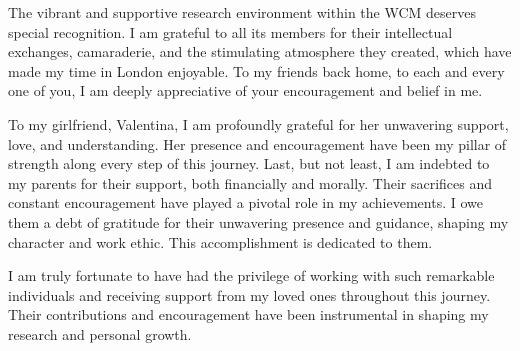 The vibrant and supportive research environment within the WCM deserves special recognition. I am grateful to all its members for their intellectual exchanges, camaraderie, and the stimulating atmosphere they created, which have made my time in London enjoyable. %
To my friends back home, to each and every one of you, I am deeply appreciative of your encouragement and belief in me.

To my girlfriend, Valentina, I am profoundly grateful for her unwavering support, love, and understanding. Her presence and encouragement have been my pillar of strength along every step of this journey. Last, but not least, I am indebted to my parents for their support, both financially and morally. Their sacrifices and constant encouragement have played a pivotal role in my achievements. I owe them a debt of gratitude for their unwavering presence and guidance, shaping my character and work ethic. This accomplishment is dedicated to them. %

I am truly fortunate to have had the privilege of working with such remarkable individuals and receiving support from my loved ones throughout this journey. Their contributions and encouragement have been instrumental in shaping my research and personal growth.
